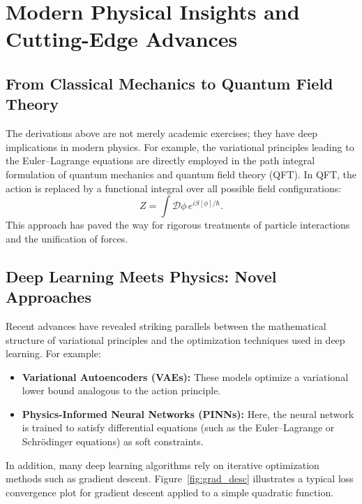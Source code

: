 \documentclass[11pt,a4paper]{article}
\begin{document}
\section{Modern Physical Insights and Cutting-Edge Advances}

\subsection{From Classical Mechanics to Quantum Field Theory}

The derivations above are not merely academic exercises; they have deep implications in modern physics. For example, the variational principles leading to the Euler--Lagrange equations are directly employed in the path integral formulation of quantum mechanics and quantum field theory (QFT). In QFT, the action is replaced by a functional integral over all possible field configurations:
\[
Z = \int \mathcal{D}\phi \, e^{i S[\phi]/\hbar}.
\]
This approach has paved the way for rigorous treatments of particle interactions and the unification of forces.

\subsection{Deep Learning Meets Physics: Novel Approaches}

Recent advances have revealed striking parallels between the mathematical structure of variational principles and the optimization techniques used in deep learning. For example:
\begin{itemize}
    \item \textbf{Variational Autoencoders (VAEs):} These models optimize a variational lower bound analogous to the action principle.
    \item \textbf{Physics-Informed Neural Networks (PINNs):} Here, the neural network is trained to satisfy differential equations (such as the Euler--Lagrange or Schrödinger equations) as soft constraints.
\end{itemize}

In addition, many deep learning algorithms rely on iterative optimization methods such as gradient descent. Figure~\ref{fig:grad_desc} illustrates a typical loss convergence plot for gradient descent applied to a simple quadratic function.
\end{document}
